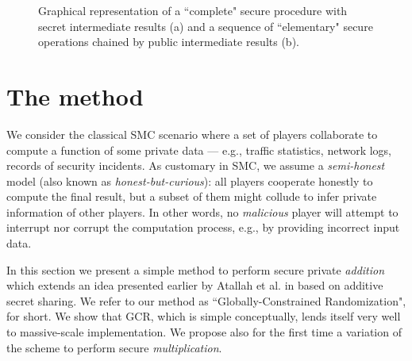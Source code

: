 \documentclass{sig-alternate}
\begin{document}
\newcommand{\mipicwidth}{0.47\textwidth}
\begin{figure*}[tb]
\centering
{}
\caption{ Graphical representation of a ``complete" secure procedure with secret intermediate results (a) and a sequence of ``elementary" secure operations chained by public intermediate results (b). } 
\label{fig:whale-dolphin}
\end{figure*}


\section{The \ata method}

We consider the classical SMC scenario where a set of  players collaborate to compute a function of some private data --- e.g., traffic statistics,  network logs, records of  security incidents.   
As customary in SMC, we assume a \emph{semi-honest} model (also known as \emph{honest-but-curious}):  {all} players cooperate honestly to compute the final result, but a subset of them might collude to infer private information of other players. 
In other words, no {\em malicious} player will attempt to interrupt nor corrupt the computation process, e.g., by providing incorrect input data.



In this section we present a simple method to perform secure private {\em addition} which extends an idea presented earlier by Atallah {et al.} in \cite[\S4.1]{Atallah04} based on additive secret sharing.
We refer to our method as ``Globally-Constrained Randomization", \ata for short. 
We show that
GCR, which is simple conceptually, lends itself very well to massive-scale implementation.
We propose also for the first time a variation of the scheme to perform secure {\em multiplication}.
\end{document}
